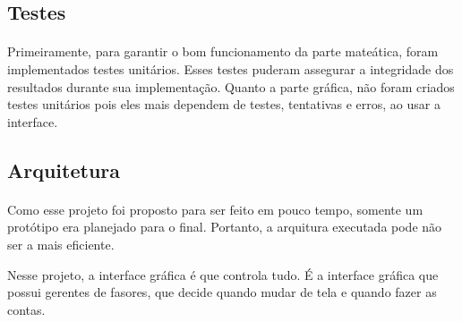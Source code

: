 \documentclass[conference,harvard, brazil]{sbatex}
\begin{document}
	\subsection{Testes}
	\paragraph{}Primeiramente, para garantir o bom funcionamento da parte mateática, foram implementados testes unitários. Esses testes puderam assegurar a integridade dos resultados durante sua implementação. Quanto a parte gráfica, não foram criados testes unitários pois eles mais dependem de testes, tentativas e erros, ao usar a interface.
	
	\subsection{Arquitetura}
	\paragraph{}Como esse projeto foi proposto para ser feito em pouco tempo, somente um protótipo era planejado para o final. Portanto, a arquitura executada pode não ser a mais eficiente.
	
	Nesse projeto, a interface gráfica é que controla tudo. É a interface gráfica que possui gerentes de fasores, que decide quando mudar de tela e quando fazer as contas.
	
\end{document}
